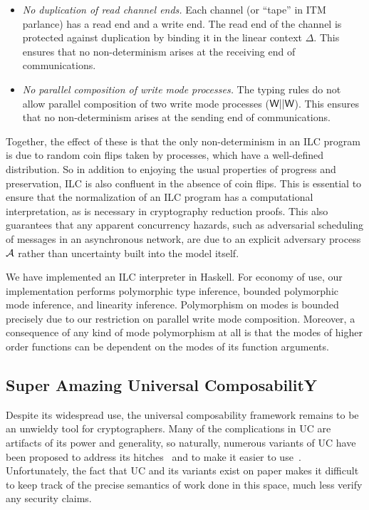\begin{itemize}[leftmargin=*]
\item \emph{No duplication of read channel ends.} Each channel (or ``tape'' in
  ITM parlance) has a read end and a write end. The read end of the channel is
  protected against duplication by binding it in the linear context $\Delta$. This
  ensures that no non-determinism arises at the receiving end of communications.

\item \emph{No parallel composition of write mode processes.} The typing rules
  do not allow parallel composition of two write mode processes ($\textsf{W} ||
  \textsf{W}$). This ensures that no non-determinism arises at the sending end of
  communications.
\end{itemize}

Together, the effect of these is that the only non-determinism in an ILC program
is due to random coin flips taken by processes, which have a well-defined
distribution. So in addition to enjoying the usual properties of progress and
preservation, ILC is also confluent in the absence of coin flips. This is
essential to ensure that the normalization of an ILC program has a computational
interpretation, as is necessary in cryptography reduction proofs. This also
guarantees that any apparent concurrency hazards, such as adversarial scheduling
of messages in an asynchronous network, are due to an explicit adversary process
$\mathcal{{A}}$ rather than uncertainty built into the model itself.

We have implemented an ILC interpreter in Haskell. For economy of use, our
implementation performs polymorphic type inference, bounded polymorphic mode
inference, and linearity inference. Polymorphism on modes is bounded precisely
due to our restriction on parallel write mode composition. Moreover, a
consequence of any kind of mode polymorphism at all is that the modes of higher
order functions can be dependent on the modes of its function arguments.

\subsection{Super Amazing Universal ComposabilitY}

Despite its widespread use, the universal composability framework remains to be
an unwieldy tool for cryptographers. Many of the complications in UC are
artifacts of its power and generality, so naturally, numerous variants of UC
have been proposed to address its hitches~\cite{backes2007reactive,
  hofheinz2015gnuc, canetti2007universally, canetti2003universal} and to make it
easier to use~\cite{canetti2015simpler}. Unfortunately, the fact that UC and its
variants exist on paper makes it difficult to keep track of the precise
semantics of work done in this space, much less verify any security claims.

